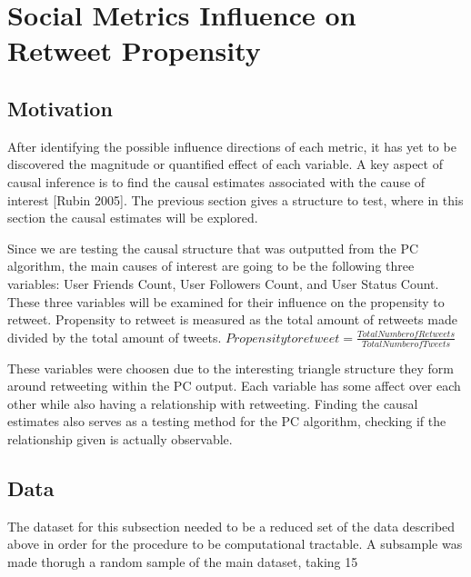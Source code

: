 \section{Social Metrics Influence on Retweet Propensity}
\subsection{Motivation}
After identifying the possible influence directions of each metric, it has yet to be discovered the magnitude or quantified effect of each variable. A key aspect of causal inference is to find the causal estimates associated with the cause of interest [Rubin 2005]. The previous section gives a structure to test, where in this section the causal estimates will be explored. 

Since we are testing the causal structure that was outputted from the PC algorithm, the main causes of interest are going to be the following three variables: User Friends Count, User Followers Count, and User Status Count. These three variables will be examined for their influence on the propensity to retweet. Propensity to retweet is measured as the total amount of retweets made divided by the total amount of tweets. $Propensity to retweet = \frac{Total Number of Retweets}{Total Number of Tweets}$

These variables were choosen due to the interesting triangle structure they form around retweeting within the PC output. Each variable has some affect over each other while also having a relationship with retweeting. Finding the causal estimates also serves as a testing method for the PC algorithm, checking if the relationship given is actually observable. 
\subsection{Data}
The dataset for this subsection needed to be a reduced set of the data described above in order for the procedure to be computational tractable. A subsample was made thorugh a random sample of the main dataset, taking 15%
